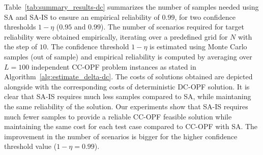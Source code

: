 

Table~\ref{tab:summary_results-dc} summarizes the number of samples needed using SA and SA-IS to ensure an empirical reliability of $0.99$, for two confidence thresholds $1-\eta$ ($0.95$ and $0.99$). The number of scenarios required for target reliability were obtained empirically, iterating over a predefined grid for $N$ with the step of $10$. The confidence threshold $1-\eta$ is estimated using Monte Carlo samples (out of sample) and empirical reliability is computed by averaging over $L=100$ independent CC-OPF problem instances as stated in Algorithm~\ref{alg:estimate_delta-dc}. The costs of solutions obtained are depicted alongside with the corresponding costs of deterministic DC-OPF solution. It is clear that SA-IS requires much less samples compared to SA, while maintaning the same reliability of the solution. Our experiments show that SA-IS requires much fewer samples to provide a reliable CC-OPF feasible solution while maintaining the same cost for each test case compared to CC-OPF with SA. The improvement in the number of scenarios is bigger for the higher confidence threshold value ($1-\eta=0.99$).

